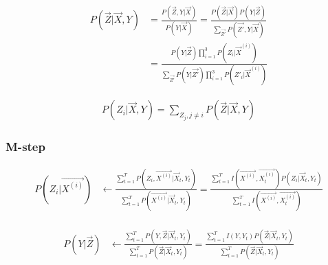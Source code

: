 \documentclass{article}
\begin{document}

$$
  \begin{aligned}
    P(\vec{Z} | \vec{X}, Y)
     & =  \frac{P(\vec{Z}, Y | \vec{X})}{P(Y | \vec{X})}
    = \frac{P(\vec{Z} | \vec{X})P(Y | \vec{Z})}{\sum_{\vec{Z'}} P(\vec{Z'}, Y | \vec{X})}                                      \\
     & = \frac{P(Y|\vec{Z})\prod_{i=1}^3P(Z_i|\vec{X}^{(i)})}{\sum_{\vec{Z'}} P(Y|\vec{Z'})\prod_{i=1}^3P(Z'_i|\vec{X}^{(i)})}
  \end{aligned}
$$

$$
  \begin{aligned}
    P(Z_i | \vec{X}, Y) = \sum_{Z_j, j\neq i} P(\vec{Z} | \vec{X}, Y)
  \end{aligned}
$$

\subsubsection{M-step}




$$
  \begin{aligned}
    P(Z_i|\vec{X^{(i)}})
     & \leftarrow \frac{\sum_{t=1}^T P(Z_i,\vec{X^{(i)}} | \vec{X}_t, Y_t)}{\sum_{t=1}^T P(\vec{X^{(i)}}| \vec{X}_t, Y_t)}
    = \frac{\sum_{t=1}^T I(\vec{X^{(i)}},  \vec{X^{(i)}_t}) P(Z_i | \vec{X}_t, Y_t)}{\sum_{t=1}^T I(\vec{X^{(i)}},  \vec{X^{(i)}_t})} \\
  \end{aligned}
$$

$$
  \begin{aligned}
    P(Y|\vec{Z})
     & \leftarrow \frac{\sum_{t=1}^T P(Y,\vec{Z} | \vec{X}_t, Y_t)}{\sum_{t=1}^T P(\vec{Z}| \vec{X}_t, Y_t)}
    = \frac{\sum_{t=1}^T I(Y,  Y_t) P(\vec{Z} | \vec{X}_t, Y_t)}{\sum_{t=1}^T P(\vec{Z}| \vec{X}_t, Y_t)}    \\
  \end{aligned}
$$
\end{document}
